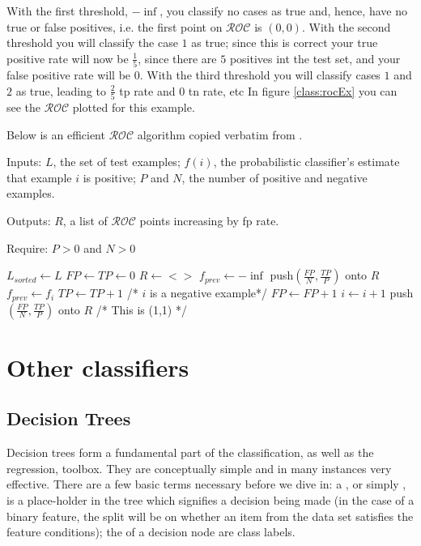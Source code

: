 \begin{example}
With the first threshold, $-\inf$, you classify no cases as true and, hence, have no true or false positives, i.e. the first point on $\mathcal{ROC}$ is $(0,0)$. With the second threshold you will classify the case $1$ as true; since this is correct your true positive rate will now be $\frac{1}{5}$, since there are $5$ positives int the test set, and your false positive rate will be $0$. With the third threshold you will classify cases $1$ and $2$ as true, leading to $\frac{2}{5}$ tp rate and $0$ tn rate, etc In figure \ref{class:rocEx} you can see the $\mathcal{ROC}$ plotted for this example. 
\end{example}



Below is an efficient $\mathcal{ROC}$ algorithm copied verbatim from \cite{ROC}. 

Inputs: $L$, the set of test examples; $f(i)$, the probabilistic classifier's estimate that example $i$ is positive; $P$ and $N$, the
number of positive and negative examples.


Outputs: $R$, a list of $\mathcal{ROC}$ points increasing by fp rate.


Require: $P > 0$ and $N > 0$


\begin{algorithmic}
    \State $L_{sorted} \leftarrow L$ 
    \State $FP \leftarrow TP \leftarrow 0$
    \State $R \leftarrow <>$
    \State $f_{prev} \leftarrow -\inf$
 \State push$(\frac{FP}{N}, \frac{TP}{P})$ onto $R$
 \State $f_{prev} \leftarrow f_i$
   \EndIf
      \State $TP \leftarrow TP + 1$
      \Else /* $i$ is a negative example*/
      \State $FP \leftarrow FP+1$
   \EndIf
   \State $i \leftarrow i+1$
\EndWhile
\State push$(\frac{FP}{N}, \frac{TP}{P})$ onto $R$ /* This is (1,1) */
\end{algorithmic}


\section{Other classifiers}


\subsection{Decision Trees}


Decision trees form a fundamental part of the classification, as well as the regression, toolbox. They are conceptually simple and in many instances very effective. 
There are a few basic terms necessary before we dive in: a , or simply , is a place-holder in the tree which signifies a decision being made (in the case of a binary feature, the split will be on whether an item from the data set satisfies the feature conditions); the  of a decision node are class labels. 

